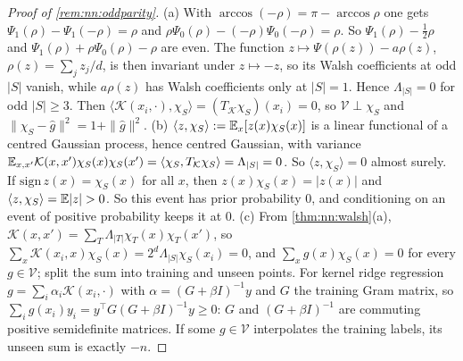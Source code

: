 \begin{proof}[Proof of \cref{rem:nn:oddparity}]
(a) With $\arccos(-\rho)=\pi-\arccos\rho$ one gets $\Psi_1(\rho)-\Psi_1(-\rho)=\rho$ and $\rho\Psi_0(\rho)-(-\rho)\Psi_0(-\rho)=\rho$. So $\Psi_1(\rho)-\frac12\rho$ and $\Psi_1(\rho)+\rho\Psi_0(\rho)-\rho$ are even. The function $z\mapsto\Psi(\rho(z))-a\rho(z)$, $\rho(z)=\sum_jz_j/d$, is then invariant under $z\mapsto-z$, so its Walsh coefficients at odd $|S|$ vanish, while $a\rho(z)$ has Walsh coefficients only at $|S|=1$. Hence $\Lambda_{|S|}=0$ for odd $|S|\ge3$. Then $\langle\mathcal K(x_i,\cdot),\chi_S\rangle=(T_{\mathcal K}\chi_S)(x_i)=0$, so $\mathcal V\perp\chi_S$ and $\|\chi_S-\hat g\|^2=1+\|\hat g\|^2$.
(b) $\langle z,\chi_S\rangle:=\mathbb{E}_x[z(x)\chi_S(x)]$ is a linear functional of a centred Gaussian process, hence centred Gaussian, with variance $\mathbb{E}_{x,x'}\mathcal K(x,x')\chi_S(x)\chi_S(x')=\langle\chi_S,T_{\mathcal K}\chi_S\rangle=\Lambda_{|S|}=0$. So $\langle z,\chi_S\rangle=0$ almost surely. If $\mathrm{sign}\,z(x)=\chi_S(x)$ for all $x$, then $z(x)\chi_S(x)=|z(x)|$ and $\langle z,\chi_S\rangle=\Ex|z|>0$. So this event has prior probability $0$, and conditioning on an event of positive probability keeps it at $0$.
(c) From \cref{thm:nn:walsh}(a), $\mathcal K(x,x')=\sum_T\Lambda_{|T|}\chi_T(x)\chi_T(x')$, so $\sum_{x}\mathcal K(x_i,x)\chi_S(x)=2^d\Lambda_{|S|}\chi_S(x_i)=0$, and $\sum_{x}g(x)\chi_S(x)=0$ for every $g\in\mathcal V$; split the sum into training and unseen points. For kernel ridge regression $g=\sum_i\alpha_i\mathcal K(x_i,\cdot)$ with $\alpha=(G+\beta I)^{-1}y$ and $G$ the training Gram matrix, so $\sum_ig(x_i)y_i=y^\top G(G+\beta I)^{-1}y\ge0$: $G$ and $(G+\beta I)^{-1}$ are commuting positive semidefinite matrices. If some $g\in\mathcal V$ interpolates the training labels, its unseen sum is exactly $-n$.
\end{proof}
